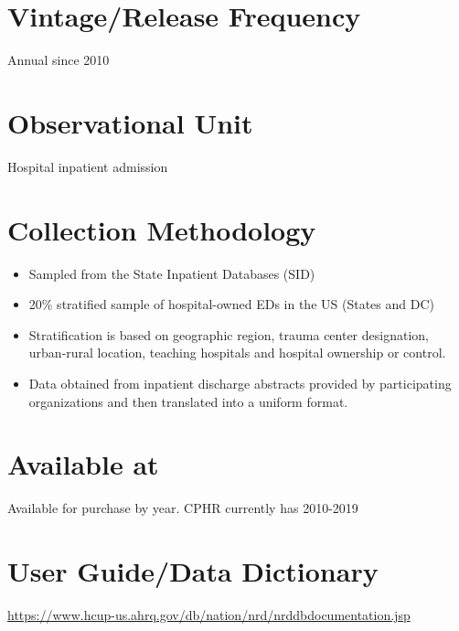 \documentclass[
]{book}
\providecommand{\tightlist}{%
  \setlength{\itemsep}{0pt}\setlength{\parskip}{0pt}}
\begin{document}
\hypertarget{vintagerelease-frequency-70}{%
\section{Vintage/Release Frequency}\label{vintagerelease-frequency-70}}

Annual since 2010

\hypertarget{observational-unit-70}{%
\section{Observational Unit}\label{observational-unit-70}}

Hospital inpatient admission

\hypertarget{collection-methodology-70}{%
\section{Collection Methodology}\label{collection-methodology-70}}

\begin{itemize}
\tightlist
\item
  Sampled from the State Inpatient Databases (SID)
\item
  20\% stratified sample of hospital-owned EDs in the US (States and DC)
\item
  Stratification is based on geographic region, trauma center designation, urban-rural location, teaching hospitals and hospital ownership or control.
\item
  Data obtained from inpatient discharge abstracts provided by participating organizations and then translated into a uniform format.
\end{itemize}

\hypertarget{available-at-70}{%
\section{Available at}\label{available-at-70}}

Available for purchase by year. CPHR currently has 2010-2019

\hypertarget{user-guidedata-dictionary-70}{%
\section{User Guide/Data Dictionary}\label{user-guidedata-dictionary-70}}

\url{https://www.hcup-us.ahrq.gov/db/nation/nrd/nrddbdocumentation.jsp}
\end{document}
